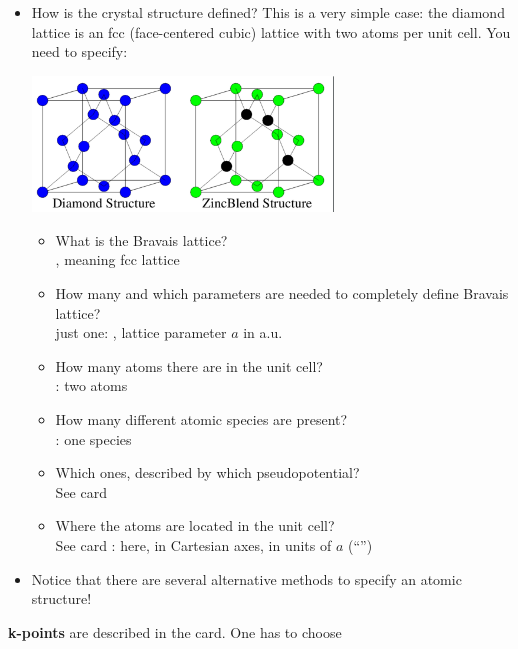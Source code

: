 \documentclass[landscape]{foils}
\begin{document}
\begin{itemize}
\item[]
\parbox{15cm}{How is the crystal structure defined? This is a very
simple case: the diamond lattice is an fcc (face-centered cubic) lattice
with two atoms per unit cell. You need to specify:}\hskip 1cm
\parbox{10cm}{\includegraphics[width=8cm]{figs/Dia-ZB.pdf}}
\begin{itemize}
\item  What is the Bravais lattice?\\
  {\gray {}, meaning fcc lattice}
\item  How many and which parameters are needed to completely 
  define Bravais lattice?\\
  {\gray just one: , lattice parameter $a$ in a.u.}
\item  How many atoms there are in the unit cell?\\
{\gray  {}: two atoms}
\item  How many different atomic species are present?\\
{\gray  {}: one species}
\item  Which ones, described by which pseudopotential? \\
{\gray  See card }
\item  Where the atoms are located in the unit cell?\\
{\gray  See card : here, in Cartesian axes,
       in units of $a$ (``'')}
\end{itemize}
\item[]Notice that there are several alternative methods to specify an atomic structure!
\end{itemize}


{\bf k-points} are described in the  card. One has to choose
\end{document}

